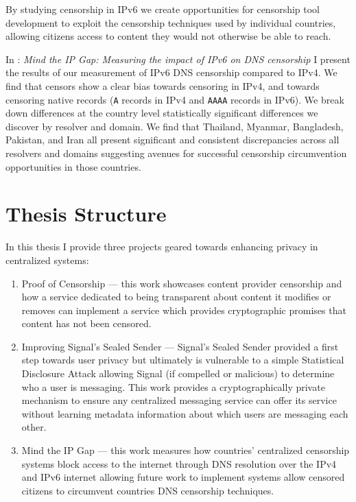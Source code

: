 By studying censorship in IPv6 we create opportunities for censorship tool
development to exploit the censorship techniques used by individual countries,
allowing citizens access to content they would not otherwise be able to reach.

In : \emph{Mind the IP Gap: Measuring the impact of IPv6 on DNS
censorship} I present the results of our measurement of IPv6 DNS censorship
compared to IPv4. We find that censors show a clear bias towards censoring in
IPv4, and towards censoring native records (\texttt{A} records in IPv4 and
\texttt{AAAA} records in IPv6). We break down differences at the country level
statistically significant differences we discover by resolver and domain. We
find that Thailand, Myanmar, Bangladesh, Pakistan, and Iran all present
significant and consistent discrepancies across all resolvers and domains
suggesting avenues for successful censorship circumvention opportunities in
those countries.

\section{Thesis Structure}
In this thesis I provide three projects geared towards enhancing privacy in
centralized systems:

\begin{enumerate}
    \item Proof of Censorship --- this work showcases content provider
    censorship and how a service dedicated to being transparent about content it
    modifies or removes can implement a service which provides cryptographic
    promises that content has not been censored.
    \item Improving Signal's Sealed Sender --- Signal's Sealed Sender provided a
    first step towards user privacy but ultimately is vulnerable to a simple
    Statistical Disclosure Attack allowing Signal (if compelled or malicious) to
    determine who a user is messaging. This work provides a cryptographically
    private mechanism to ensure any centralized messaging service can offer its
    service without learning metadata information about which users are
    messaging each other.
    \item Mind the IP Gap --- this work measures how countries' centralized
    censorship systems block access to the internet through DNS resolution over
    the IPv4 and IPv6 internet allowing future work to implement systems allow
    censored citizens to circumvent countries DNS censorship techniques.
\end{enumerate}
